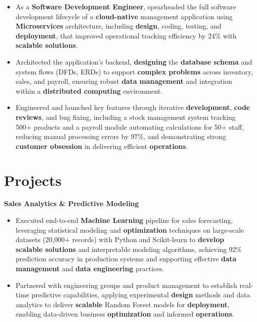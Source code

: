 \documentclass[a4paper,10pt]{article}
\begin{document}
\begin{itemize}[leftmargin=*, itemsep=0pt, parsep=1pt] %
\vspace{-7mm}
    \item As a \textbf{Software Development Engineer}, spearheaded the full software development lifecycle of a \textbf{cloud-native} management application using \textbf{Microservices} architecture, including \textbf{design}, coding, testing, and \textbf{deployment}, that improved operational tracking efficiency by 24\% with \textbf{scalable solutions}.
\item Architected the application's backend, \textbf{designing} the \textbf{database schema} and system flows (DFDs, ERDs) to support \textbf{complex problems} across inventory, sales, and payroll, ensuring robust \textbf{data management} and integration within a \textbf{distributed computing} environment.
\item Engineered and launched key features through iterative \textbf{development}, \textbf{code reviews}, and bug fixing, including a stock management system tracking 500+ products and a payroll module automating calculations for 50+ staff, reducing manual processing errors by 97\%, and demonstrating strong \textbf{customer obsession} in delivering efficient \textbf{operations}. 
\end{itemize}

\vspace{-4mm}

\section*{Projects}
\textbf{Sales Analytics \& Predictive Modeling} \\
\begin{itemize}[leftmargin=*, itemsep=0pt, parsep=1pt]
\vspace{-7mm}
    \item Executed end-to-end \textbf{Machine Learning} pipeline for sales forecasting, leveraging statistical modeling and \textbf{optimization} techniques on large-scale datasets (20,000+ records) with Python and Scikit-learn to \textbf{develop scalable solutions} and interpretable modeling algorithms, achieving 92\% prediction accuracy in production systems and supporting effective \textbf{data management} and \textbf{data engineering} practices.
    \item Partnered with engineering groups and product management to establish real-time predictive capabilities, applying experimental \textbf{design} methods and data analytics to deliver \textbf{scalable} Random Forest models for \textbf{deployment}, enabling data-driven business \textbf{optimization} and informed \textbf{operations}.
    \end{itemize}
\end{document}
